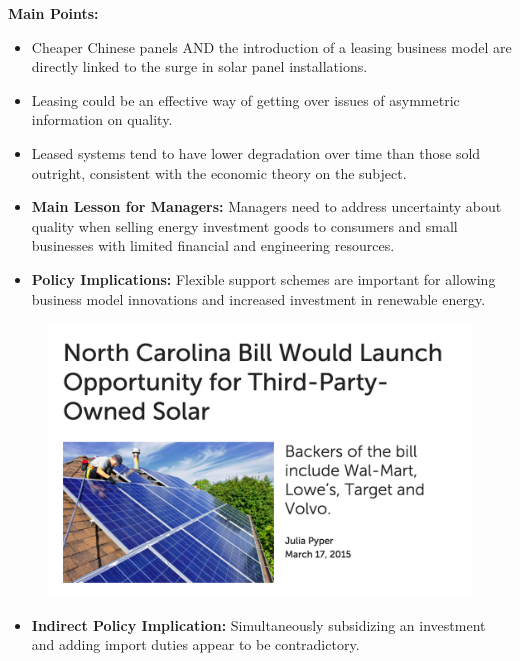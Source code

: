 \documentclass{beamer}
\begin{document}
\begin{frame}[plain]
\textbf{Main Points:}
	\begin{itemize}
	\item Cheaper Chinese panels AND the introduction of a leasing business model are directly linked to the surge in solar panel installations. 
	\item Leasing could be an effective way of getting over issues of asymmetric information on quality. 
	\item Leased systems tend to have lower degradation over time than those sold outright, consistent with the economic theory on the subject.
	\end{itemize}
\end{frame}

\begin{frame}[plain]
	\begin{itemize}
	\item[] \textbf{Main Lesson for Managers:} Managers need to address uncertainty about quality when selling energy investment goods to consumers and small businesses with limited financial and engineering resources.
	\end{itemize}
\end{frame}

\begin{frame}[plain]
	\begin{itemize}
	\item[] \textbf{Policy Implications:} Flexible support schemes are important for allowing business model innovations and increased investment in renewable energy.
	\end{itemize}
\end{frame}

\begin{frame}[plain]
	\begin{figure}
		\includegraphics[width=1\textwidth]{figures/Northcarolina_3rd_party_law.png}
	
	\end{figure}
\end{frame}


\begin{frame}[plain]
	\begin{itemize}
	\item[] \textbf{Indirect Policy Implication:} Simultaneously subsidizing an investment and adding import duties appear to be contradictory.  
	\end{itemize}
\end{frame}
\end{document}
